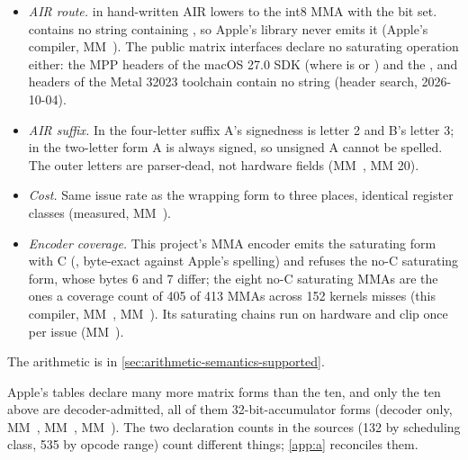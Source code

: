 \begin{itemize}
\item \emph{AIR route.}  in hand-written AIR lowers to the int8 MMA with the bit set.
   contains no string containing , so Apple's library never emits it (Apple's compiler,
  MM~). The public matrix interfaces declare no saturating operation either: the MPP headers of the macOS 27.0 SDK
  (where  is  or ) and the
  ,  and  headers of the Metal 32023
  toolchain contain no string  (header search, 2026-10-04).
\item \emph{AIR suffix.} In the four-letter suffix A's signedness is letter 2 and B's letter 3; in the two-letter form A is
  always signed, so unsigned A cannot be spelled. The outer letters are parser-dead, not hardware fields (MM~, MM
  20).
\item \emph{Cost.} Same issue rate as the wrapping form to three places, identical register classes (measured, MM~).
\item \emph{Encoder coverage.} This project's MMA encoder emits the saturating form with C (,
  byte-exact against Apple's  spelling) and refuses the no-C saturating form, whose bytes 6 and 7 differ; the
  eight no-C saturating MMAs are the ones a coverage count of 405 of 413 MMAs across 152 kernels misses (this compiler,
  MM~, MM~). Its saturating chains run on hardware and clip once per issue (MM~).
\end{itemize}

The arithmetic is in \cref{sec:arithmetic-semantics-supported}.

Apple's tables declare many more matrix forms than the ten, and only the ten above are
decoder-admitted, all of them 32-bit-accumulator forms (decoder only, MM~, MM~, MM~). The two declaration
counts in the sources (132 by scheduling class, 535 by opcode range) count different things; \cref{app:a} reconciles
them.

